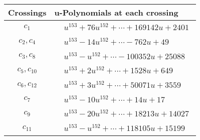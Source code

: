 \documentclass[1p]{elsarticle_modified}
\theoremstyle{definition}
\begin{document}
\begin{tabular}{m{50pt}|m{274pt}}
Crossings & \hspace{64pt}u-Polynomials at each crossing \\
\hline $$\begin{aligned}c_{1}\end{aligned}$$&$\begin{aligned}
&u^{153}+76 u^{152}+\cdots+169142 u+2401
\end{aligned}$\\
\hline $$\begin{aligned}c_{2},c_{4}\end{aligned}$$&$\begin{aligned}
&u^{153}-14 u^{152}+\cdots-762 u+49
\end{aligned}$\\
\hline $$\begin{aligned}c_{3},c_{8}\end{aligned}$$&$\begin{aligned}
&u^{153}- u^{152}+\cdots-100352 u+25088
\end{aligned}$\\
\hline $$\begin{aligned}c_{5},c_{10}\end{aligned}$$&$\begin{aligned}
&u^{153}+2 u^{152}+\cdots+1528 u+649
\end{aligned}$\\
\hline $$\begin{aligned}c_{6},c_{12}\end{aligned}$$&$\begin{aligned}
&u^{153}+3 u^{152}+\cdots+50071 u+3559
\end{aligned}$\\
\hline $$\begin{aligned}c_{7}\end{aligned}$$&$\begin{aligned}
&u^{153}-10 u^{152}+\cdots+14 u+17
\end{aligned}$\\
\hline $$\begin{aligned}c_{9}\end{aligned}$$&$\begin{aligned}
&u^{153}-20 u^{152}+\cdots+18213 u+14027
\end{aligned}$\\
\hline $$\begin{aligned}c_{11}\end{aligned}$$&$\begin{aligned}
&u^{153}- u^{152}+\cdots+118105 u+15199
\end{aligned}$\\
\hline
\end{tabular}\\~\\
\end{document}
